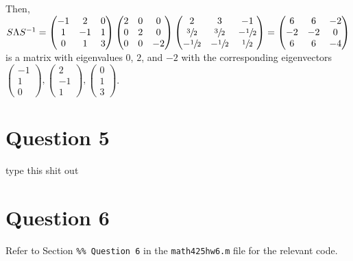 \documentclass[12pt]{article}
\newcommand{\code}[1]{\texttt{#1}}
\begin{document}
Then, $S\Lambda S^{-1}=\begin{pmatrix}
    -1 & 2 & 0 \\
    1 & -1 & 1 \\
    0 & 1 & 3
\end{pmatrix}
\begin{pmatrix}
    2 & 0 & 0 \\
    0 & 2 & 0 \\
    0 & 0 & -2 \\
\end{pmatrix}
\begin{pmatrix}
    2 & 3 & -1 \\
    \sfrac{3}{2} & \sfrac{3}{2} & -\sfrac{1}{2} \\
    -\sfrac{1}{2} & -\sfrac{1}{2} & \sfrac{1}{2}
\end{pmatrix}
= \begin{pmatrix}
     6 & 6  & -2 \\
    -2 & -2 & 0 \\
     6 & 6  & -4
\end{pmatrix}$ is a matrix with eigenvalues $0$, $2$, and $-2$ with the corresponding eigenvectors $\begin{pmatrix} -1 \\ 1 \\ 0 \end{pmatrix}, \begin{pmatrix} 2 \\ -1 \\ 1 \end{pmatrix}, \begin{pmatrix} 0 \\ 1 \\ 3 \end{pmatrix}$.

\section*{Question 5}

type this shit out

\section*{Question 6}

Refer to Section \code{\%\% Question 6} in the \code{math425hw6.m} file for the relevant code.
\end{document}
